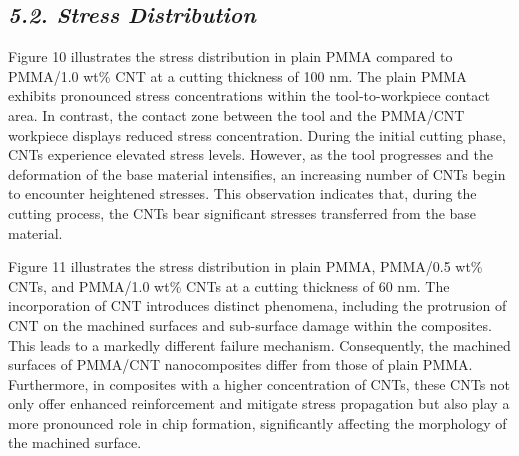 \documentclass{article}
\begin{document}
\subsection*{\emph{5.2. Stress Distribution}}

Figure 10 illustrates the stress distribution in plain PMMA compared to PMMA/1.0 wt\% CNT at a cutting thickness of 100 nm. The plain PMMA exhibits pronounced stress concentrations within the tool-to-workpiece contact area. In contrast, the contact zone between the tool and the PMMA/CNT workpiece displays reduced stress concentration. During the initial cutting phase, CNTs experience elevated stress levels. However, as the tool progresses and the deformation of the base material intensifies, an increasing number of CNTs begin to encounter heightened stresses. This observation indicates that, during the cutting process, the CNTs bear significant stresses transferred from the base material.

Figure 11 illustrates the stress distribution in plain PMMA, PMMA/0.5 wt\% CNTs, and PMMA/1.0 wt\% CNTs at a cutting thickness of 60 nm. The incorporation of CNT introduces distinct phenomena, including the protrusion of CNT on the machined surfaces and sub-surface damage within the composites. This leads to a markedly different failure mechanism. Consequently, the machined surfaces of PMMA/CNT nanocomposites differ from those of plain PMMA. Furthermore, in composites with a higher concentration of CNTs, these CNTs not only offer enhanced reinforcement and mitigate stress propagation but also play a more pronounced role in chip formation, significantly affecting the morphology of the machined surface.
\end{document}
